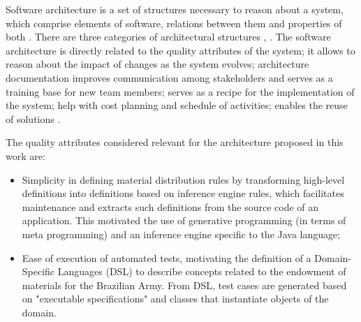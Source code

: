 Software architecture is a set of structures necessary to reason about a system, which comprise elements of software, relations between them and properties of both \cite{bass2013software}. There are three categories of architectural structures \cite{clements2011documenting}, \cite{bass2013software}. The software architecture is directly related to the quality attributes of the system; it allows to reason about the impact of changes as the system evolves; architecture documentation improves communication among stakeholders and serves as a training base for new team members; serves as a recipe for the implementation of the system; help with cost planning and schedule of activities; enables the reuse of solutions \cite{bass2013software}.


The quality attributes considered relevant for the architecture proposed in this work are:

\begin{itemize}


\item Simplicity in defining material distribution rules by transforming high-level definitions into definitions based on inference engine rules, which facilitates maintenance and extracts such definitions from the source code of an application. This motivated the use of generative programming (in terms of meta programming) and an inference engine specific to the Java language;


\item Ease of execution of automated tests, motivating the definition of a Domain-Specific Languages (DSL) to describe concepts related to the endowment of materials for the Brazilian Army. From DSL, test cases are generated based on "executable specifications" and classes that instantiate objects of the domain.

\end{itemize}


